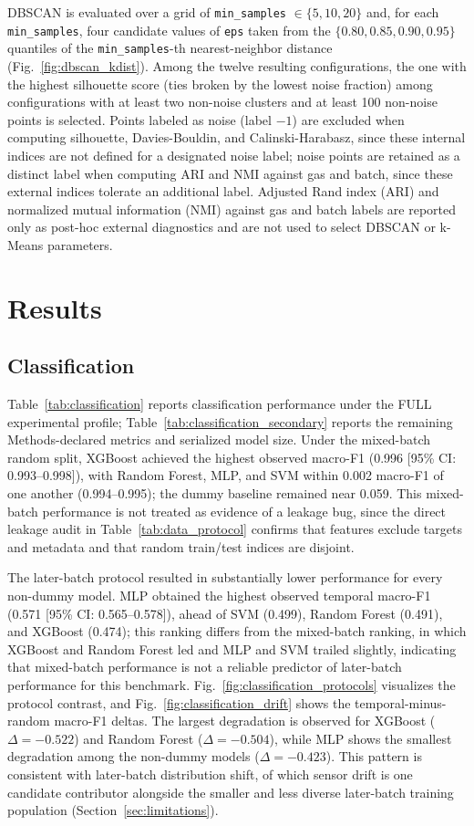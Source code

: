 \documentclass[conference]{IEEEtran}
\begin{document}
DBSCAN \cite{ester1996} is evaluated over a grid of \texttt{min\_samples} $\in\{5,10,20\}$ and, for each \texttt{min\_samples}, four candidate values of \texttt{eps} taken from the $\{0.80,0.85,0.90,0.95\}$ quantiles of the \texttt{min\_samples}-th nearest-neighbor distance (Fig.~\ref{fig:dbscan_kdist}). Among the twelve resulting configurations, the one with the highest silhouette score (ties broken by the lowest noise fraction) among configurations with at least two non-noise clusters and at least 100 non-noise points is selected. Points labeled as noise (label $-1$) are excluded when computing silhouette, Davies-Bouldin, and Calinski-Harabasz, since these internal indices are not defined for a designated noise label; noise points are retained as a distinct label when computing ARI and NMI against gas and batch, since these external indices tolerate an additional label. Adjusted Rand index (ARI) and normalized mutual information (NMI) against gas and batch labels are reported only as post-hoc external diagnostics and are not used to select DBSCAN or k-Means parameters.

\section{Results}
\label{sec:results}
\subsection{Classification}
Table~\ref{tab:classification} reports classification performance under the FULL experimental profile; Table~\ref{tab:classification_secondary} reports the remaining Methods-declared metrics and serialized model size. Under the mixed-batch random split, XGBoost achieved the highest observed macro-F1 (0.996 [95\% CI: 0.993--0.998]), with Random Forest, MLP, and SVM within 0.002 macro-F1 of one another (0.994--0.995); the dummy baseline remained near 0.059. This mixed-batch performance is not treated as evidence of a leakage bug, since the direct leakage audit in Table~\ref{tab:data_protocol} confirms that features exclude targets and metadata and that random train/test indices are disjoint.

The later-batch protocol resulted in substantially lower performance for every non-dummy model. MLP obtained the highest observed temporal macro-F1 (0.571 [95\% CI: 0.565--0.578]), ahead of SVM (0.499), Random Forest (0.491), and XGBoost (0.474); this ranking differs from the mixed-batch ranking, in which XGBoost and Random Forest led and MLP and SVM trailed slightly, indicating that mixed-batch performance is not a reliable predictor of later-batch performance for this benchmark. Fig.~\ref{fig:classification_protocols} visualizes the protocol contrast, and Fig.~\ref{fig:classification_drift} shows the temporal-minus-random macro-F1 deltas. The largest degradation is observed for XGBoost ($\Delta=-0.522$) and Random Forest ($\Delta=-0.504$), while MLP shows the smallest degradation among the non-dummy models ($\Delta=-0.423$). This pattern is consistent with later-batch distribution shift, of which sensor drift is one candidate contributor alongside the smaller and less diverse later-batch training population (Section~\ref{sec:limitations}).
\end{document}
